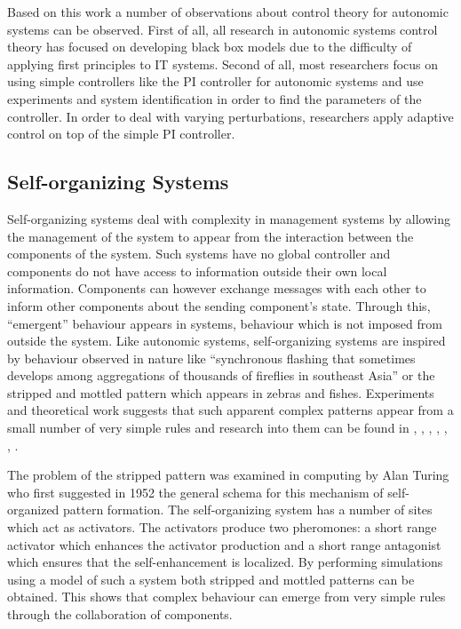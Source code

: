 Based on this work a number of observations about control theory for autonomic systems can be observed. First of all, all research in autonomic systems control theory has focused on developing black box models due to the difficulty of applying first principles to IT systems. Second of all, most researchers focus on using simple controllers like the PI controller for autonomic systems and use experiments and system identification in order to find the parameters of the controller. In order to deal with varying perturbations, researchers apply adaptive control on top of the simple PI controller.

\subsection{Self-organizing Systems}

Self-organizing systems deal with complexity in management systems by allowing the management of the system to appear from the interaction between the components of the system. Such systems have no global controller and components do not have access to information outside their own local information. Components can however exchange messages with each other to inform other components about the sending component's state. Through this, ``emergent'' behaviour appears in systems, behaviour which is not imposed from outside the system. Like autonomic systems, self-organizing systems are inspired by behaviour observed in nature like ``synchronous flashing that sometimes develops among aggregations of thousands of fireflies in southeast Asia'' or the stripped and mottled pattern which appears in zebras and fishes. Experiments and theoretical work suggests that such apparent complex patterns appear from a small number of very simple rules and research into them can be found in \cite{related:selforganization-honeybee}, \cite{related:selforganization-autoscaling}, \cite{related:selforganization-autoscaling2}, \cite{related:selforganization-plant}, \cite{related:selforganization-healing1}, \cite{related:selforganization-healing2}, \cite{related:selforganization-energymanagement}.

The problem of the stripped pattern was examined in computing by Alan Turing who first suggested in 1952 the general schema for this mechanism of self-organized pattern formation. The self-organizing system has a number of sites which act as activators. The activators produce two pheromones: a short range activator which enhances the activator production and a short range antagonist which ensures that the self-enhancement is localized. By performing simulations using a model of such a system both stripped and mottled patterns can be obtained. This shows that complex behaviour can emerge from very simple rules through the collaboration of components.

